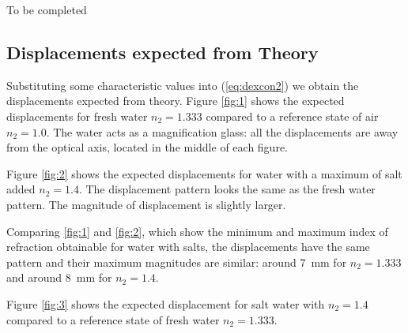\documentclass{article}
\begin{document}
\vspace{1cm}
To be completed 
\vspace{1cm}

\subsection{Displacements expected from Theory}
Substituting some characteristic values into (\ref{eq:dexcon2}) we obtain the displacements expected from theory. Figure \ref{fig:1} shows the expected displacements for fresh water $n_2 = 1.333$ compared to a reference state of air $n_2 = 1.0$. The water acts as a magnification glass: all the displacements are away from the optical axis, located in the middle of each figure. 

Figure \ref{fig:2} shows the expected displacements for water with a maximum of salt added $n_2 = 1.4$. The displacement pattern looks the same as the fresh water pattern. The magnitude of displacement is slightly larger. 

Comparing \ref{fig:1} and \ref{fig:2}, which show the minimum and maximum index of refraction obtainable for water with salts, the displacements have the same pattern and their maximum magnitudes are similar: around \SI{7}{\milli\metre} for $n_2 = 1.333$ and around \SI{8}{\milli\metre} for $n_2 = 1.4$.

Figure \ref{fig:3} shows the expected displacement for salt water with $n_2 = 1.4$ compared to a reference state of fresh water $n_2 = 1.333$. 
\end{document}
